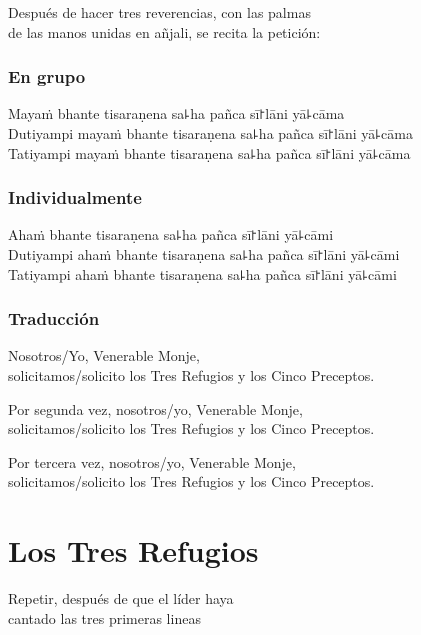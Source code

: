 \begin{instruction}
  Después de hacer tres reverencias, con las palmas\\
  de las manos unidas en añjali, se recita la petición:
\end{instruction}

\subsection{En grupo}

Mayaṁ bhante tisaraṇena sa꜕ha pañca sī꜓lāni yā꜕cāma\\
Dutiyampi mayaṁ bhante tisaraṇena sa꜕ha pañca sī꜓lāni yā꜕cāma\\
Tatiyampi mayaṁ bhante tisaraṇena sa꜕ha pañca sī꜓lāni yā꜕cāma

\subsection{Individualmente}

Ahaṁ bhante tisaraṇena sa꜕ha pañca sī꜓lāni yā꜕cāmi\\
Dutiyampi ahaṁ bhante tisaraṇena sa꜕ha pañca sī꜓lāni yā꜕cāmi\\
Tatiyampi ahaṁ bhante tisaraṇena sa꜕ha pañca sī꜓lāni yā꜕cāmi

\subsection{Traducción}

\begin{english}
  Nosotros/Yo, Venerable Monje,\\
  \vin solicitamos/solicito los Tres Refugios y los Cinco Preceptos.
  
  Por segunda vez, nosotros/yo, Venerable Monje,\\
  \vin solicitamos/solicito los Tres Refugios y los Cinco Preceptos.
  
  Por tercera vez, nosotros/yo, Venerable Monje,\\
  \vin solicitamos/solicito los Tres Refugios y los Cinco Preceptos.
\end{english}

\clearpage
\chapter{Los Tres Refugios}

\begin{instruction}
  Repetir, después de que el líder haya\\
  cantado las tres primeras lineas
\end{instruction}

